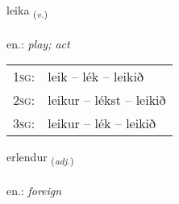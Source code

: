 \documentclass[frontgrid, backgrid]{flacards}\usepackage[]{graphicx}\usepackage[]{xcolor}
\begin{document}
\renewcommand{\flhead}{\vskip5pt \fboxsep=0pt {\small\bfseries\footnotesize Sagnorð | Verb}}
\renewcommand{\fcfoot}{\vskip5pt \fboxsep=0pt \hspace{2pt}{\small\bfseries\footnotesize 1K}}

\renewcommand{\blhead}{\vskip5pt {\small\bfseries\footnotesize Sagnorð | Verb }}
\renewcommand{\bcfoot}{\vskip5pt \hspace{2pt}{\small\bfseries\footnotesize 1K}}


{leika \small{\textsubscript{(\textit{v.})}} \\[1ex] %
\textphonetic{[leiːka]} \\
en.: \emph{play; act} \\  [2ex]
\renewcommand*{\arraystretch}{0.8}
\begin{tabular}{p{1cm}l}
\textsc{1sg}: & leik -- lék -- leikið \\ 
\textsc{2sg}: & leikur -- lékst -- leikið \\ 
\textsc{3sg}: & leikur -- lék -- leikið \\ 
\end{tabular}
}

\renewcommand{\flhead}{\vskip5pt \fboxsep=0pt {\small\bfseries\footnotesize Lýsingarorð | Adjective}}
\renewcommand{\fcfoot}{\vskip5pt \fboxsep=0pt \hspace{2pt}{\small\bfseries\footnotesize 1K}}

\renewcommand{\blhead}{\vskip5pt {\small\bfseries\footnotesize Lýsingarorð | Adjective }}
\renewcommand{\bcfoot}{\vskip5pt \hspace{2pt}{\small\bfseries\footnotesize 1K}}


{erlendur \small{\textsubscript{(\textit{adj.})}} \\[1ex] %
\textphonetic{[ɛrlɛntʏr]} \\
en.: \emph{foreign} \\  [2ex]
\renewcommand*{\arraystretch}{0.8}
}
\end{document}
